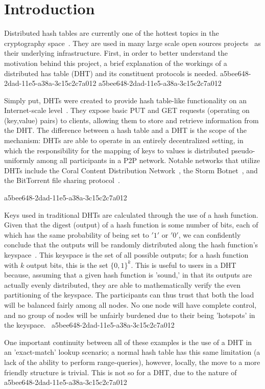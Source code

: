 \documentclass[12pt]{article}
\begin{document}
\section{Introduction}
\par Distributed hash tables are currently one of the hottest topics in the cryptography space~\cite{Stoica:2001dj,Rowstron:2001ea,Ratnasamy:2001wn}. They are used in many large scale open sources projects~\cite{Freitas:2013tb,Xu:2010vs,Perfitt:2010fh} as their underlying infrastructure. First, in order to better understand the motivation behind this project, a brief explanation of the workings of a distributed has table (DHT) and its constituent protocols is needed.
a5bee648-2dad-11e5-a38a-3c15c2c7a012
a5bee648-2dad-11e5-a38a-3c15c2c7a012\par Simply put, DHTs were created to provide hash table-like functionality on an Internet-scale level~\cite{Ratnasamy:2001wn}. They expose basic PUT and GET requests (operating on (key,value) pairs) to clients, allowing them to store and retrieve information from the DHT. The difference between a hash table and a DHT is the scope of the mechanism: DHTs are able to operate in an entirely decentralized setting, in which the responsibility for the mapping of keys to values is distributed pseudo-uniformly among all participants in a P2P network. Notable networks that utilize DHTs include the Coral Content Distribution Network~\cite{Freedman:2004vb}, the Storm Botnet~\cite{Holz:2008uk}, and the BitTorrent file sharing protocol~\cite{Cohen:y1_8mBnw}.

a5bee648-2dad-11e5-a38a-3c15c2c7a012\par Keys used in traditional DHTs are calculated through the use of a hash function. Given that the digest (output) of a hash function is some number of bits, each of which has the same probability of being set to $'1'$ or $'0'$, we can confidently conclude that the outputs will be randomly distributed along the hash function's keyspace~. This keyspace is the set of all possible outputs; for a hash function with $k$ output bits, this is the set $\{0,1\}^k$. This is useful to users in a DHT because, assuming that a given hash function is 'sound,' in that its outputs are actually evenly distributed, they are able to mathematically verify the even partitioning of the keyspace. The participants can thus trust that both the load will be balanced fairly among all nodes. No one node will have complete control, and no group of nodes will be unfairly burdened due to their being 'hotspots' in the keyspace.~
a5bee648-2dad-11e5-a38a-3c15c2c7a012
\par One important continuity between all of these examples is the use of a DHT in an 'exact-match' lookup scenario; a normal hash table has this same limitation (a lack of the ability to perform range-queries), however, locally, the move to a more friendly structure is trivial. This is not so for a DHT, due to the nature of
a5bee648-2dad-11e5-a38a-3c15c2c7a012\printbibliography
\end{document}
